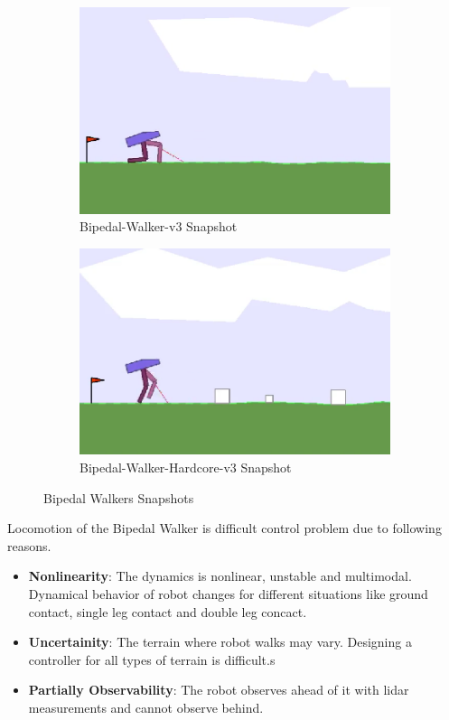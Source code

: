 \begin{figure}
	\begin{subfigure}{.5\textwidth}
		\centering
		\includegraphics[width=0.9\linewidth]{figures/bipedal/classic.png}
		\caption{Bipedal-Walker-v3 Snapshot}
		\label{fig:bipedal_walker_classic}
	\end{subfigure}
	\begin{subfigure}{.5\textwidth}
		\centering
		\includegraphics[width=0.9\linewidth]{figures/bipedal/hardcore.png}
		\caption{Bipedal-Walker-Hardcore-v3 Snapshot}
		\label{fig:bipedal_walker_hardcore}
	\end{subfigure}
	\caption{Bipedal Walkers Snapshots}
	\label{fig:bipedal_walkers}
\end{figure}

Locomotion of the Bipedal Walker is difficult control problem due to following reasons. 

\begin{itemize}
	\item \textbf{Nonlinearity}: The dynamics is nonlinear, unstable and multimodal. Dynamical behavior of robot changes for different situations like ground contact, single leg contact and double leg concact. 
	\item \textbf{Uncertainity}: The terrain where robot walks may vary. Designing a controller for all types of terrain is difficult.s
	\item \textbf{Partially Observability}: The robot observes ahead of it with lidar measurements and cannot observe behind. 
\end{itemize}

